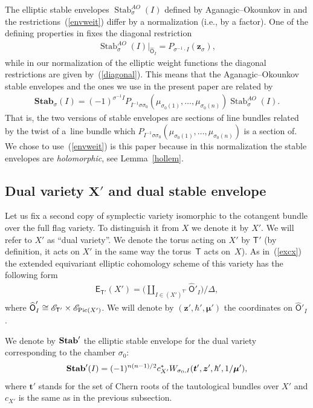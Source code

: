 \documentclass[pdftex]{sigma}
\DeclareMathOperator\Stab{Stab}
\newcommand{\bT}{\mathsf{T}}
\newcommand{\Or}{\textsf{O}}
\newcommand{\cE}{\mathscr{E}}
\def\ttt{{\boldsymbol t}}
\def\zz{{\boldsymbol z}}
\def\mub{{\boldsymbol\mu}}
\numberwithin{equation}{section}
\begin{document}
\begin{Remark} The elliptic stable envelopes $\Stab^{AO}_{\sigma}(I)$ defined by Aganagic--Okounkov in \cite{AOelliptic} and the restrictions~(\ref{envweit}) differ by a normalization (i.e., by a factor). One of the defining properties in \cite{AOelliptic} fixes the diagonal restriction
\begin{gather*}
 \Stab^{AO}_{\sigma}(I)\big|_{\widehat{\Or}_{I}}=P_{\sigma^{-1} \cdot I}(\zz_{\sigma}),
\end{gather*}
while in our normalization of the elliptic weight functions the diagonal restrictions are given by~(\ref{diagonal}). This means that the Aganagic--Okounkov stable envelopes and the ones we use in the present paper are related by
\begin{gather*}
\textbf{Stab}_{\sigma}(I)=(-1)^{\sigma^{-1} I} P_{I^{-1} \sigma \sigma_{0}}(\mu_{\sigma_0(1)},\dots,\mu_{\sigma_0(n)}) \Stab^{AO}_{\sigma}(I).
\end{gather*}
That is, the two versions of stable envelopes are sections of line bundles related by the twist of a~line bundle which $P_{I^{-1} \sigma \sigma_{0}}(\mu_{\sigma_0(1)}, \dots,\mu_{\sigma_0(n)})$ is a section of. We chose to use~(\ref{envweit}) is this paper because in this normalization the stable envelopes are \textit{holomorphic}, see Lemma~\ref{hollem}.
\end{Remark}

\subsection[Dual variety $X'$ and dual stable envelope]{Dual variety $\boldsymbol{X'}$ and dual stable envelope}
 Let us fix a second copy of symplectic variety isomorphic to the cotangent bundle over the full flag variety. To distinguish it from $X$ we denote it by $X'$. We will refer to $X'$ as ``dual variety''. We denote the torus acting on $X'$ by $\bT'$ (by definition, it acts on $X'$ in the same way the torus~$\bT$ acts on~$X$). As in~(\ref{excx}) the extended equivariant elliptic cohomology scheme of this variety has the following form
\begin{gather} \label{duext}
\textsf{E}_{\bT'}(X')=\bigg(\coprod\limits_{I\in (X')^{\bT'}} \widehat{\Or}'_{I}\bigg)/\Delta,
\end{gather}
 where $\widehat{\Or}'_{I}\cong \cE_{\bT'} \times \cE_{{\rm Pic}(X')}$. We will denote by $(\zz',\hbar',\mub')$ the coordinates on $\widehat{\Or}'_{I}$.

We denote by ${\bf Stab}'$ the elliptic stable envelope for the dual variety corresponding to the chamber $\sigma_{0}$:
 \begin{gather} \label{duenv}
 {\bf Stab}' (I)=(-1)^{n(n-1)/2} c_{X'}^{*} W_{\sigma_{0},I}(\ttt',\zz',\hbar',1/\mub'),
 \end{gather}
where $\ttt'$ stands for the set of Chern roots of the tautological bundles over $X'$ and $c_{X'}$ is the same as in the previous subsection.
\end{document}
